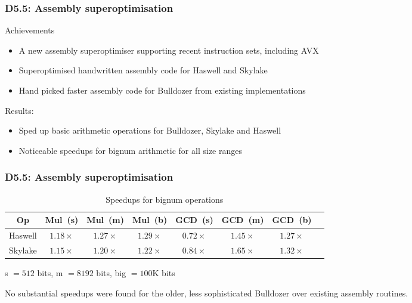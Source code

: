 \documentclass{beamer}
\begin{document}
\begin{frame}

\frametitle{D5.5: Assembly superoptimisation}

\begin{block} {Achievements}
\begin{itemize}
\item A new assembly superoptimiser supporting recent instruction sets, including AVX 
\item Superoptimised handwritten assembly code for Haswell and Skylake 
\item Hand picked faster assembly code for Bulldozer from existing implementations 
\end{itemize}
\end{block}
\begin{block}
  {Results:}
\begin{itemize}
\item Sped up basic arithmetic operations for Bulldozer, Skylake and Haswell 
\item Noticeable speedups for bignum arithmetic for all size ranges
\end{itemize}
\end{block}

\end{frame}
\begin{frame}[fragile]

\frametitle{D5.5: Assembly superoptimisation}


\begin{table}
\caption{Speedups for bignum operations}
  \begin{tabular}{cccccccc}
  \toprule
{Op} & \mbox{Mul (s)} & \mbox{Mul (m)} & \mbox{Mul (b)} & \mbox{GCD (s)} & \mbox{GCD (m)} & \mbox{GCD (b)} \\
\midrule
{Haswell} & $1.18\times$ & $1.27\times$ & $1.29\times$ & $0.72\times$ & $1.45\times$ & $1.27\times$\\
{Skylake} & $1.15\times$ & $1.20\times$ & $1.22\times$ & $0.84\times$ & $1.65\times$ & $1.32\times$ \\
\bottomrule
\end{tabular}
\end{table}

s $= 512$ bits, m $= 8192$ bits, big $= 100$K bits 

No substantial speedups were found for the older, less sophisticated Bulldozer over existing assembly routines.

\end{frame}
\end{document}
